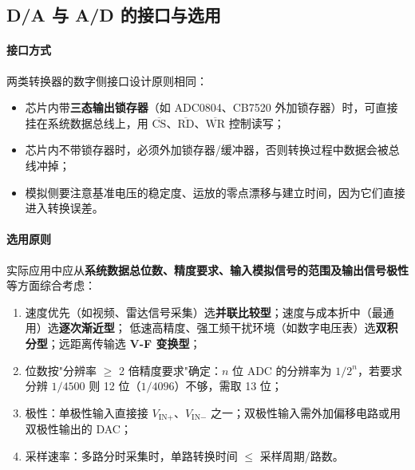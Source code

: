\subsection{D/A 与 A/D 的接口与选用}
\paragraph{接口方式}
两类转换器的数字侧接口设计原则相同：
\begin{itemize}
    \item 芯片内带\textbf{三态输出锁存器}（如 ADC0804、CB7520 外加锁存器）时，可直接挂在系统数据总线上，用 $\overline{\text{CS}}$、$\overline{\text{RD}}$、$\overline{\text{WR}}$ 控制读写；
    \item 芯片内不带锁存器时，必须外加锁存器/缓冲器，否则转换过程中数据会被总线冲掉；
    \item 模拟侧要注意基准电压的稳定度、运放的零点漂移与建立时间，因为它们直接进入转换误差。
\end{itemize}

\paragraph{选用原则}
实际应用中应从\textbf{系统数据总位数、精度要求、输入模拟信号的范围及输出信号极性}等方面综合考虑：
\begin{enumerate}
    \item 速度优先（如视频、雷达信号采集）选\textbf{并联比较型}；速度与成本折中（最通用）选\textbf{逐次渐近型}；
    低速高精度、强工频干扰环境（如数字电压表）选\textbf{双积分型}；远距离传输选 \textbf{V-F 变换型}；
    \item 位数按"分辨率 $\ge$ 2 倍精度要求"确定：$n$ 位 ADC 的分辨率为 $1/2^n$，若要求分辨 $1/4500$ 则 12 位（$1/4096$）不够，需取 13 位；
    \item 极性：单极性输入直接接 $V_{\text{IN}+}$、$V_{\text{IN}-}$ 之一；双极性输入需外加偏移电路或用双极性输出的 DAC；
    \item 采样速率：多路分时采集时，单路转换时间 $\le$ 采样周期/路数。
\end{enumerate}

